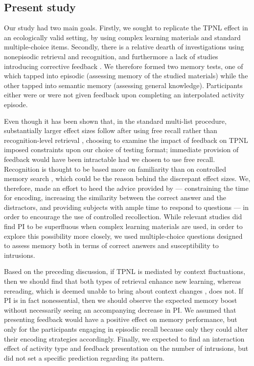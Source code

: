 \documentclass[../main.tex]{subfiles}
\begin{document}
\subsection{Present study\label{present}}

Our study had two main goals. Firstly, we sought to replicate the TPNL 
effect in an ecologically valid setting, by using complex learning materials 
and standard multiple-choice items. Secondly, there 
is a relative dearth of 
investigations using nonepisodic retrieval and 
recognition, and furthermore 
a lack of studies introducing corrective feedback 
\citep{chanRetrievalPotentiatesNew2018}. We therefore 
formed two memory 
tests, one of which tapped into episodic (assessing 
memory of the studied 
materials) while the other tapped into semantic 
memory (assessing general 
knowledge). Participants either were or were not 
given feedback upon 
completing an interpolated activity episode.

Even though it has been shown that, in the standard 
multi-list procedure, 
substantially larger effect sizes follow after 
using free recall rather than 
recognition-level retrieval  
\citep{chanRetrievalPotentiatesNew2018}, 
choosing to examine the impact of feedback on TPNL 
imposed constraints upon 
our choice of testing format; immediate provision of 
feedback would have 
been intractable had we chosen to use free recall. 
Recognition is thought to 
be based more on familiarity than on controlled 
memory search 
\citep{yonelinasNatureRecollectionFamiliarity2002}, 
which could be the 
reason behind the discrepant effect sizes. We, 
therefore, made an effort to 
heed the advice provided by 
\cite{chanTestingEffectRecognition2007} --- 
constraining the time for encoding, increasing the 
similarity between the 
correct answer and the distractors, and providing 
subjects with ample time 
to respond to questions --- in order to encourage 
the use of controlled 
recollection. While relevant studies did find PI to 
be superfluous when 
complex learning materials are used, in order to 
explore this possibility 
more closely, we used multiple-choice questions 
designed to assess memory 
both in terms of correct answers and susceptibility 
to intrusions. 

Based on the preceding discussion, if TPNL is 
mediated by context 
fluctuations, then we should find that both types of 
retrieval enhance new 
learning, whereas rereading, which is deemed unable to 
bring about context 
changes \citep{chanRetrievalPotentiatesNew2018}, does 
not. If PI is in fact 
nonessential, then we should observe the expected 
memory boost without 
necessarily seeing an accompanying decrease in 
PI. We assumed that presenting feedback 
would have a positive 
effect on memory performance, but only for the 
participants engaging in 
episodic recall because only they could alter their 
encoding strategies 
accordingly. Finally, we expected to find an 
interaction effect of activity 
type and feedback presentation on the number of 
intrusions, but did not set 
a specific prediction regarding its pattern.


{
	\biblio
}
\end{document}
